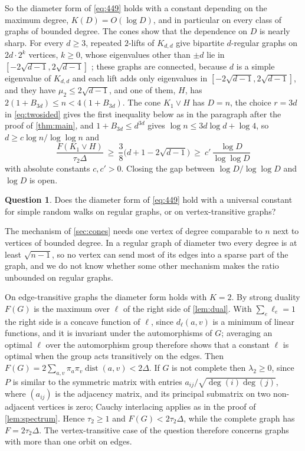 \documentclass[11pt]{amsart}
\theoremstyle{definition}
\newtheorem{question}[theorem]{Question}
\DeclareMathOperator{\dist}{dist}
\begin{document}
So the diameter form of \eqref{eq:449} holds with a constant depending on the maximum degree, $K(D)=O(\log D)$, and in particular on every class of graphs of bounded degree. The cones show that the dependence on $D$ is nearly sharp. For every $d\ge3$, repeated $2$-lifts of $K_{d,d}$ give bipartite $d$-regular graphs on $2d\cdot2^k$ vertices, $k\ge0$, whose eigenvalues other than $\pm d$ lie in $[-2\sqrt{d-1},2\sqrt{d-1}]$ \cite{MSS}; these graphs are connected, because $d$ is a simple eigenvalue of $K_{d,d}$ and each lift adds only eigenvalues in $[-2\sqrt{d-1},2\sqrt{d-1}]$, and they have $\mu_2\le2\sqrt{d-1}$, and one of them, $H$, has $2(1+B_{3d})\le n<4(1+B_{3d})$. The cone $K_1\vee H$ has $D=n$, the choice $r=3d$ in \eqref{eq:twosided} gives the first inequality below as in the paragraph after the proof of \cref{thm:main}, and $1+B_{3d}\le d^{3d}$ gives $\log n\le3d\log d+\log4$, so $d\ge c\log n/\log\log n$ and
\[
\frac{F(K_1\vee H)}{\tau_2\Delta}\ \ge\ \frac38\bigl(d+1-2\sqrt{d-1}\bigr)\ \ge\ c'\,\frac{\log D}{\log\log D}
\]
with absolute constants $c,c'>0$. Closing the gap between $\log D/\log\log D$ and $\log D$ is open.

\begin{question}
Does the diameter form of \eqref{eq:449} hold with a universal constant for simple random walks on regular graphs, or on vertex-transitive graphs?
\end{question}

The mechanism of \cref{sec:cones} needs one vertex of degree comparable to $n$ next to vertices of bounded degree. In a regular graph of diameter two every degree is at least $\sqrt{n-1}$, so no vertex can send most of its edges into a sparse part of the graph, and we do not know whether some other mechanism makes the ratio unbounded on regular graphs.

On edge-transitive graphs the diameter form holds with $K=2$. By strong duality $F(G)$ is the maximum over $\ell$ of the right side of \cref{lem:dual}. With $\sum_e\ell_e=1$ the right side is a concave function of $\ell$, since $d_\ell(a,v)$ is a minimum of linear functions, and it is invariant under the automorphisms of $G$; averaging an optimal $\ell$ over the automorphism group therefore shows that a constant $\ell$ is optimal when the group acts transitively on the edges. Then $F(G)=2\sum_{a,v}\pi_a\pi_v\dist(a,v)<2\Delta$. If $G$ is not complete then $\lambda_2\ge0$, since $P$ is similar to the symmetric matrix with entries $a_{ij}/\sqrt{\deg(i)\deg(j)}$, where $(a_{ij})$ is the adjacency matrix, and its principal submatrix on two non-adjacent vertices is zero; Cauchy interlacing applies as in the proof of \cref{lem:spectrum}. Hence $\tau_2\ge1$ and $F(G)<2\tau_2\Delta$, while the complete graph has $F=2\tau_2\Delta$. The vertex-transitive case of the question therefore concerns graphs with more than one orbit on edges.
\end{document}
